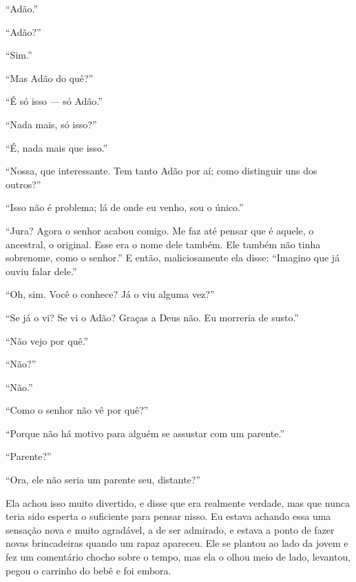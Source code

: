 “Adão.”

“Adão?”

“Sim.”

“Mas Adão do quê?”

“É só isso --- só Adão.”

“Nada mais, só isso?”

“É, nada mais que isso.”

“Nossa, que interessante. Tem tanto Adão por aí; como distinguir uns dos outros?”

“Isso não é problema; lá de onde eu venho, sou o único.”

“Jura? Agora o senhor acabou comigo. Me faz até pensar que é aquele, o
ancestral, o original. Esse era o nome dele também. Ele também não tinha
sobrenome, como o senhor.” E então, maliciosamente ela disse: “Imagino que já ouviu falar
dele.”

“Oh, sim. Você o conhece? Já o viu alguma vez?”

“Se já o vi? Se vi o Adão? Graças a Deus não. Eu morreria de susto.”

“Não vejo por quê.”

“Não?”

“Não.”

“Como o senhor não vê por quê?”

“Porque não há motivo para alguém se assustar com um parente.”

“Parente?”

“Ora, ele não seria um parente seu, distante?”

Ela achou isso muito divertido, e disse que era realmente verdade,
mas que nunca teria sido esperta o suficiente para pensar nisso. Eu estava
achando essa uma sensação nova e muito agradável, a de ser admirado, e estava a
ponto de fazer novas brincadeiras quando um rapaz apareceu. Ele se
plantou ao lado da jovem e fez um comentário chocho sobre o tempo, mas ela o
olhou meio de lado, levantou, pegou o carrinho do bebê e foi embora.


